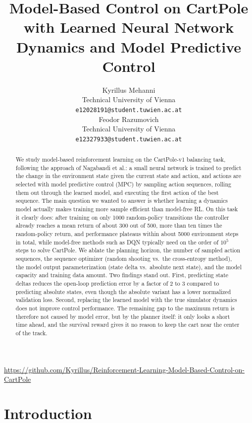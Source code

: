 \documentclass{article}
\title{Model-Based Control on CartPole with Learned Neural Network Dynamics and Model Predictive Control}
\author{
  Kyrillus Mehanni \\
  Technical University of Vienna \\
  \texttt{e12028191@student.tuwien.ac.at} \\
  \And
  Feodor Razumovich \\
  Technical University of Vienna \\
  \texttt{e12327933@student.tuwien.ac.at} \\
}
\begin{document}
\maketitle

\begin{abstract}
We study model-based reinforcement learning on the CartPole-v1 balancing task, following the approach of Nagabandi et al.: a small neural network is trained to predict the change in the environment state given the current state and action, and actions are selected with model predictive control (MPC) by sampling action sequences, rolling them out through the learned model, and executing the first action of the best sequence. The main question we wanted to answer is whether learning a dynamics model actually makes training more sample efficient than model-free RL. On this task it clearly does: after training on only 1000 random-policy transitions the controller already reaches a mean return of about 300 out of 500, more than ten times the random-policy return, and performance plateaus within about 5000 environment steps in total, while model-free methods such as DQN typically need on the order of $10^5$ steps to solve CartPole. We ablate the planning horizon, the number of sampled action sequences, the sequence optimizer (random shooting vs.\ the cross-entropy method), the model output parameterization (state delta vs.\ absolute next state), and the model capacity and training data amount. Two findings stand out. First, predicting state deltas reduces the open-loop prediction error by a factor of 2 to 3 compared to predicting absolute states, even though the absolute variant has a lower normalized validation loss. Second, replacing the learned model with the true simulator dynamics does not improve control performance. The remaining gap to the maximum return is therefore not caused by model error, but by the planner itself: it only looks a short time ahead, and the survival reward gives it no reason to keep the cart near the center of the track.
\end{abstract}

\begin{center}
  \footnotesize \url{https://github.com/Kyrillus/Reinforcement-Learning-Model-Based-Control-on-CartPole}
\end{center}

\section{Introduction}
\end{document}
